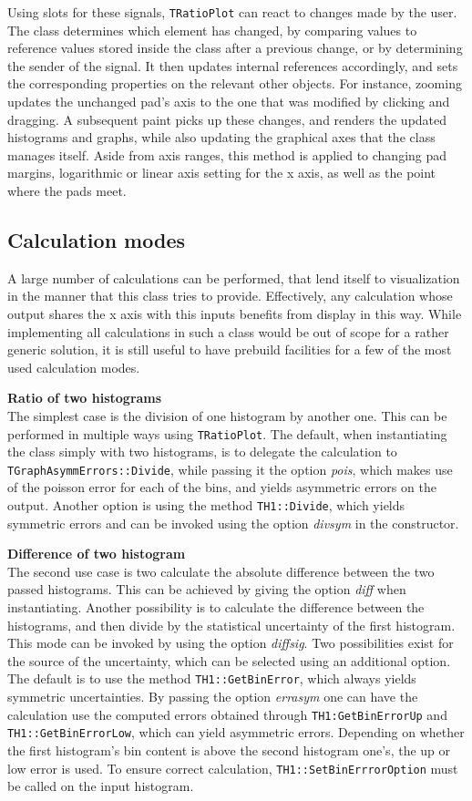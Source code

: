 Using slots for these signals, \texttt{TRatioPlot} can react to changes made by the user. The class
determines which element has changed, by comparing values to reference values stored inside the 
class after a previous change, or by determining the sender of the signal. It then updates internal
references accordingly, and sets the corresponding properties on the relevant other objects. For instance,
zooming updates the unchanged pad's axis to the one that was modified by clicking and dragging. A subsequent
paint picks up these changes, and renders the updated histograms and graphs, while also updating the
graphical axes that the class manages itself. Aside from axis ranges, this method is applied to changing
pad margins, logarithmic or linear axis setting for the x axis, as well as the point where the pads meet.

\subsection{Calculation modes}
A large number of calculations can be performed, that lend itself to visualization in the manner that
this class tries to provide. Effectively, any calculation whose output shares the x axis with this
inputs benefits from display in this way. While implementing all calculations in such a class would
be out of scope for a rather generic solution, it is still useful to have prebuild facilities for 
a few of the most used calculation modes. 

\textbf{Ratio of two histograms}\\
The simplest case is the division of one histogram by another one. This can be performed in multiple
ways using \texttt{TRatioPlot}. The default, when instantiating the class simply with two histograms,
is to delegate the calculation to \texttt{TGraphAsymmErrors::Divide}, while passing it the option
\emph{pois}, which makes use of the poisson error for each of the bins, and yields asymmetric errors on
the output. Another option is using the method \texttt{TH1::Divide}, which yields symmetric errors
and can be invoked using the option \emph{divsym} in the constructor.

\textbf{Difference of two histogram}\\
The second use case is two calculate the absolute difference between the two passed histograms.
This can be achieved by giving the option \emph{diff} when instantiating. Another possibility is 
to calculate the difference between the histograms, and then divide by the statistical uncertainty of
the first histogram. This mode can be invoked by using the option \emph{diffsig}. Two possibilities
exist for the source of the uncertainty, which can be selected using an additional option. The default is
to use the method \texttt{TH1::GetBinError}, which always yields symmetric uncertainties. By passing
the option \emph{errasym} one can have the calculation use the computed errors obtained through
\texttt{TH1:GetBinErrorUp} and \texttt{TH1::GetBinErrorLow}, which can yield asymmetric errors. Depending
on whether the first histogram's bin content is above the second histogram one's, the up or low
error is used. To ensure correct calculation, \texttt{TH1::SetBinErrrorOption} must be called on the
input histogram.

